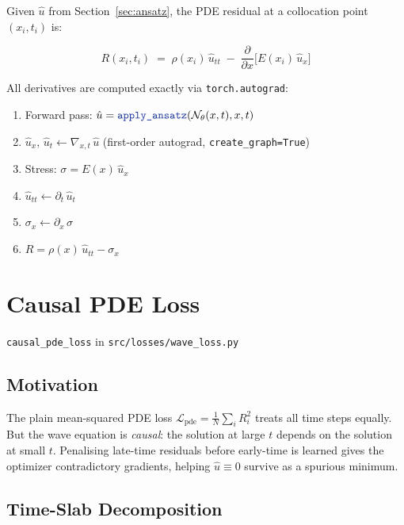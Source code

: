 \documentclass[11pt, a4paper]{article}
\newcommand{\fn}[1]{\texttt{\color{codeblue}#1}}
\newcommand{\file}[1]{\texttt{#1}}
\begin{document}
Given $\hat{u}$ from Section~\ref{sec:ansatz}, the PDE residual at a
collocation point $(x_i, t_i)$ is:

\begin{equation}
  R(x_i, t_i)
  \;=\;
  \rho(x_i)\,\hat{u}_{tt}
  \;-\;
  \frac{\partial}{\partial x}\!\bigl[E(x_i)\,\hat{u}_x\bigr]
  \label{eq:residual}
\end{equation}

All derivatives are computed exactly via \texttt{torch.autograd}:

\begin{enumerate}
  \item Forward pass: $\hat{u} = \fn{apply\_ansatz}(\mathcal{N}_\theta(x,t), x, t)$
  \item $\hat{u}_x,\, \hat{u}_t \leftarrow \nabla_{x,t}\,\hat{u}$
        \quad (first-order autograd, \texttt{create\_graph=True})
  \item Stress: $\sigma = E(x)\,\hat{u}_x$
  \item $\hat{u}_{tt} \leftarrow \partial_t\,\hat{u}_t$
  \item $\sigma_x \leftarrow \partial_x\,\sigma$
  \item $R = \rho(x)\,\hat{u}_{tt} - \sigma_x$
\end{enumerate}


\section{Causal PDE Loss}
\fn{causal\_pde\_loss} in \file{src/losses/wave\_loss.py}

\subsection{Motivation}

The plain mean-squared PDE loss
$\mathcal{L}_{\mathrm{pde}} = \frac{1}{N}\sum_i R_i^2$
treats all time steps equally. But the wave equation is \emph{causal}: the
solution at large $t$ depends on the solution at small $t$. Penalising
late-time residuals before early-time is learned gives the optimizer
contradictory gradients, helping $\hat{u}\equiv 0$ survive as a spurious
minimum.

\subsection{Time-Slab Decomposition}
\end{document}
